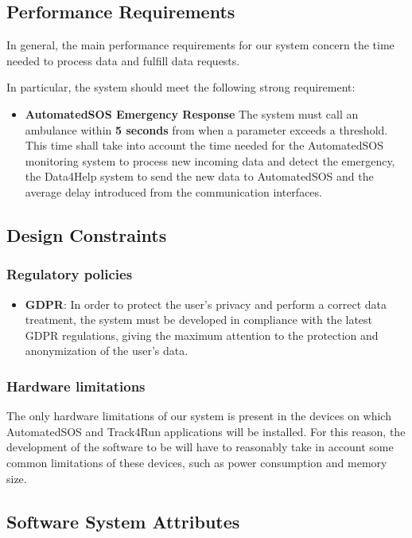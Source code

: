 \subsection{Performance Requirements}
In general, the main performance requirements for our system concern the time needed to process data and fulfill data requests.

In particular, the system should meet the following strong requirement:

\begin{itemize}
	\item \textbf{AutomatedSOS Emergency Response}
	The system must call an ambulance within \textbf{5 seconds} from when a parameter exceeds a threshold. This time shall take into account the time needed for the AutomatedSOS monitoring system to process new incoming data and detect the emergency, the Data4Help system to send the new data to AutomatedSOS and the average delay introduced from the communication interfaces.
\end{itemize}

\subsection{Design Constraints}
\subsubsection{Regulatory policies}
\begin{itemize}
	\item \textbf{GDPR}: In order to protect the user's privacy and perform a correct data treatment, the system must be developed in compliance with the latest GDPR regulations, giving the maximum attention to the protection and anonymization of the user's data.
\end{itemize}
\subsubsection{Hardware limitations}
The only hardware limitations of our system is present in the devices on which AutomatedSOS and Track4Run applications will be installed. For this reason, the development of the software to be will have to reasonably take in account some common limitations of these devices, such as power consumption and memory size.


\subsection{Software System Attributes}
